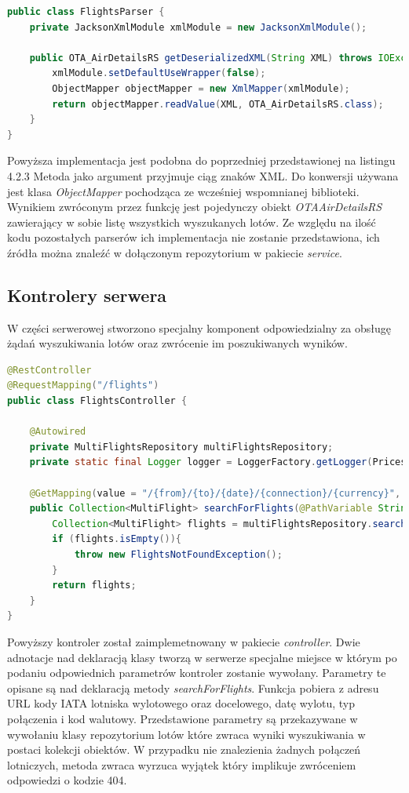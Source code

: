 \documentclass[12pt, twoside]{report}
\begin{document}
\begin{lstlisting}[language=java, caption=Implementacja parsowania treści XML]
public class FlightsParser {
    private JacksonXmlModule xmlModule = new JacksonXmlModule();

    public OTA_AirDetailsRS getDeserializedXML(String XML) throws IOException {
        xmlModule.setDefaultUseWrapper(false);
        ObjectMapper objectMapper = new XmlMapper(xmlModule);
        return objectMapper.readValue(XML, OTA_AirDetailsRS.class);
    }
}

\end{lstlisting}
Powyższa implementacja jest podobna do poprzedniej przedstawionej na listingu 4.2.3 Metoda jako argument przyjmuje ciąg znaków XML. Do konwersji używana jest klasa \textit{ObjectMapper} pochodząca ze wcześniej wspomnianej biblioteki. Wynikiem zwróconym przez funkcję jest pojedynczy obiekt \textit{OTAAirDetailsRS} zawierający w sobie listę wszystkich wyszukanych lotów.
Ze względu na ilość kodu pozostałych parserów ich implementacja nie zostanie przedstawiona, ich źródła można znaleźć w dołączonym repozytorium w pakiecie \textit{service}.
\subsection{Kontrolery serwera}
W części serwerowej stworzono specjalny komponent odpowiedzialny za obsługę żądań wyszukiwania lotów oraz zwrócenie im poszukiwanych wyników. 
\begin{lstlisting}[language=java, caption=Implementacja parsowania treści XML]
@RestController
@RequestMapping("/flights")
public class FlightsController {

    @Autowired
    private MultiFlightsRepository multiFlightsRepository;
    private static final Logger logger = LoggerFactory.getLogger(PricesRepository.class);

    @GetMapping(value = "/{from}/{to}/{date}/{connection}/{currency}", produces = MediaType.APPLICATION_JSON_VALUE)
    public Collection<MultiFlight> searchForFlights(@PathVariable String from, @PathVariable String to, @PathVariable String date, @PathVariable String connection, @PathVariable String currency) throws AirportsNotFoundException, IOException {
        Collection<MultiFlight> flights = multiFlightsRepository.searchForMultiFlights(from, to, date, connection, currency);
        if (flights.isEmpty()){
            throw new FlightsNotFoundException();
        }
        return flights;
    }
}
\end{lstlisting}
Powyższy kontroler został zaimplemetnowany w pakiecie \textit{controller}. Dwie adnotacje nad deklaracją klasy tworzą w serwerze specjalne miejsce w którym po podaniu odpowiednich parametrów kontroler zostanie wywołany. Parametry te opisane są nad deklaracją metody \textit{searchForFlights}. Funkcja pobiera z adresu URL kody IATA lotniska wylotowego oraz docelowego, datę wylotu, typ połączenia i kod walutowy. Przedstawione parametry są przekazywane w wywołaniu klasy repozytorium lotów które zwraca wyniki wyszukiwania w postaci kolekcji obiektów. W przypadku nie znalezienia żadnych połączeń lotniczych, metoda zwraca wyrzuca wyjątek który implikuje zwróceniem odpowiedzi o kodzie 404.
\end{document}
